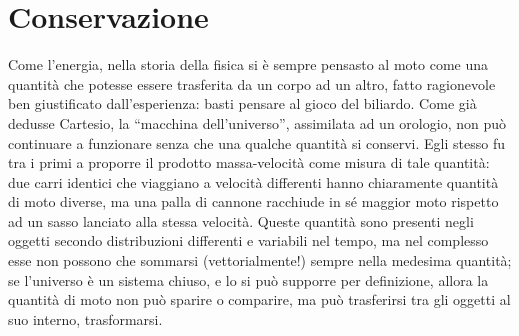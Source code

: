 \section{Conservazione}
Come l'energia, nella storia della fisica si è sempre pensasto al moto
come una quantità che potesse essere trasferita da un corpo ad un altro,
fatto ragionevole ben giustificato dall'esperienza: basti pensare al
gioco del biliardo.
Come già dedusse Cartesio, la ``macchina dell'universo'', assimilata ad
un orologio, non può continuare a funzionare senza che una qualche quantità
si conservi. Egli stesso fu tra i primi a proporre il prodotto massa-velocità
come misura di tale quantità: due carri identici che viaggiano a velocità differenti
hanno chiaramente quantità di moto diverse, ma una palla di cannone
racchiude in sé maggior moto rispetto ad un sasso lanciato alla stessa
velocità. Queste quantità sono presenti negli oggetti secondo distribuzioni
differenti e variabili nel tempo, ma nel complesso esse non possono che
sommarsi (vettorialmente!) sempre nella medesima quantità; se l'universo è un
sistema chiuso, e lo si può supporre per definizione, allora la quantità di moto
non può sparire o comparire, ma può trasferirsi tra gli oggetti al suo
interno, trasformarsi.

